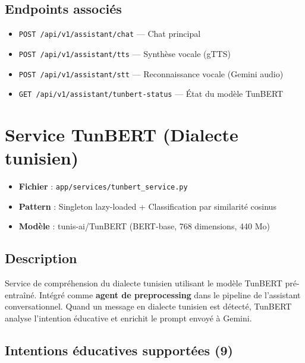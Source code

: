 \documentclass[12pt,a4paper]{article}
\begin{document}
\subsection{Endpoints associés}

\begin{itemize}
    \item \texttt{POST /api/v1/assistant/chat} --- Chat principal
    \item \texttt{POST /api/v1/assistant/tts} --- Synthèse vocale (gTTS)
    \item \texttt{POST /api/v1/assistant/stt} --- Reconnaissance vocale (Gemini audio)
    \item \texttt{GET /api/v1/assistant/tunbert-status} --- État du modèle TunBERT
\end{itemize}

\section{Service TunBERT (Dialecte tunisien)}

\begin{itemize}[leftmargin=*]
    \item \textbf{Fichier} : \texttt{app/services/tunbert\_service.py}
    \item \textbf{Pattern} : Singleton lazy-loaded + Classification par similarité cosinus
    \item \textbf{Modèle} : tunis-ai/TunBERT (BERT-base, 768 dimensions, 440 Mo)
\end{itemize}

\subsection{Description}
Service de compréhension du dialecte tunisien utilisant le modèle TunBERT pré-entraîné. Intégré comme \textbf{agent de preprocessing} dans le pipeline de l'assistant conversationnel. Quand un message en dialecte tunisien est détecté, TunBERT analyse l'intention éducative et enrichit le prompt envoyé à Gemini.

\subsection{Intentions éducatives supportées (9)}
\end{document}
